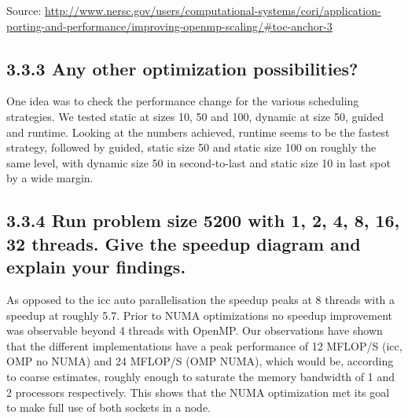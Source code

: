 Source: \url{http://www.nersc.gov/users/computational-systems/cori/application-porting-and-performance/improving-openmp-scaling/#toc-anchor-3}


\subsection*{3.3.3 Any other optimization possibilities?}
One idea was to check the performance change for the various scheduling strategies. We tested static at sizes 10, 50 and 100, dynamic at size 50, guided and runtime.
Looking at the numbers achieved, runtime seems to be the fastest strategy, followed by guided, static size 50 and static size 100 on roughly the same level, with dynamic size 50 in second-to-last and static size 10 in last spot by a wide margin. 



\subsection*{3.3.4 Run problem size 5200 with 1, 2, 4, 8, 16, 32 threads. Give the speedup diagram and explain your findings.}



As opposed to the icc auto parallelisation the speedup peaks at 8 threads with a speedup at roughly 5.7. Prior to NUMA optimizations no speedup improvement was observable beyond 4 threads with OpenMP. Our observations have shown that the different implementations have a peak performance of 12 MFLOP/S (icc, OMP no NUMA) and 24 MFLOP/S (OMP NUMA), which would be, according to coarse estimates, roughly enough to saturate the memory bandwidth of 1 and 2 processors respectively. This shows that the NUMA optimization met its goal to make full use of both sockets in a node. 